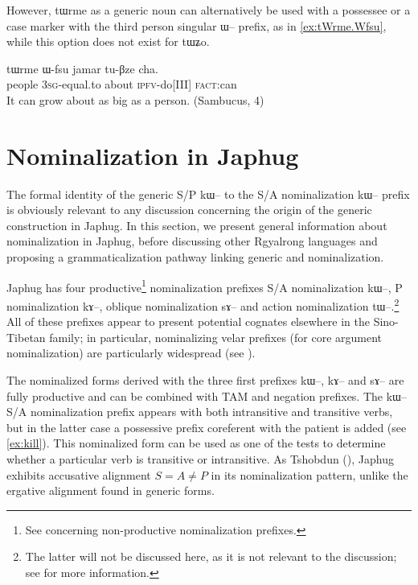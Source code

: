 \documentclass[oldfontcommands,oneside,a4paper,11pt]{article}
\newcommand{\ipa}[1]{{\phon \mbox{#1}}} %
\begin{document}
However, \ipa{tɯrme} as a generic noun can alternatively be used with a possessee or a case marker with the third person singular \ipa{ɯ--} prefix, as in \ref{ex:tWrme.Wfsu}, while this option does not exist for \ipa{tɯʑo}.

\begin{exe}
\ex  \label{ex:tWrme.Wfsu}
\gll
 	\ipa{tɯrme} 	\ipa{ɯ-fsu} 	\ipa{jamar} 	\ipa{tu-βze} 	\ipa{cha.} \\
people \textsc{3sg}-equal.to about \textsc{ipfv}-do[III] \textsc{fact}:can \\
\glt It can grow about as big as a person. (Sambucus, 4)
\end{exe}
 
 

 \section{Nominalization in Japhug} \label{sec:nmlz}
The formal identity of the generic S/P \ipa{kɯ--} to the S/A nominalization \ipa{kɯ--} prefix is obviously relevant to any discussion concerning the origin of the generic construction in Japhug. In this section, we present general information about nominalization in Japhug, before discussing other Rgyalrong languages and proposing a grammaticalization pathway linking generic and nominalization. 

Japhug has four productive\footnote{See \citet[4-6]{jacques14antipassive} concerning non-productive nominalization prefixes.} nominalization prefixes S/A nominalization \ipa{kɯ--},   P nominalization \ipa{kɤ--},   oblique nominalization \ipa{sɤ--}  and   action nominalization \ipa{tɯ--}.\footnote{The latter will not be discussed here, as it is not relevant to the discussion; see \citet[6-9]{jacques14antipassive}  for more information.}   All of these prefixes appear to present potential cognates elsewhere in the Sino-Tibetan family; in particular, nominalizing velar prefixes (for core argument nominalization) are particularly widespread (see \citealt{konnerth09nmlz}). 

 
The nominalized forms derived with the three first prefixes \ipa{kɯ--}, \ipa{kɤ}-- and \ipa{sɤ}-- are fully productive and can be combined with TAM and negation prefixes.  The \ipa{kɯ--} S/A nominalization prefix appears with both intransitive and transitive verbs, but in the latter case a possessive prefix  coreferent with the patient is added (see \ref{ex:kill}). This nominalized form can be used as one of the tests to determine whether a particular verb is transitive or intransitive. As Tshobdun (\citealt{jackson03caodeng}),  Japhug exhibits accusative alignment $S=A\neq P$ in its nominalization pattern, unlike the ergative alignment found in generic forms. 
\end{document}
